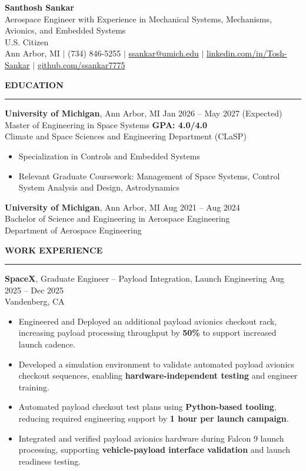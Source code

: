 \documentclass[10pt]{article}
\newcommand{\ressection}[1]{
  \vspace{0.12em}
  {\large\bfseries #1}\par
  \vspace{0.05em}\hrule\vspace{0.12em}
}
\begin{document}
\begin{center}
{\LARGE {\bfseries Santhosh Sankar}} \\
{\small Aerospace Engineer with Experience in Mechanical Systems, Mechanisms, Avionics, and Embedded Systems} \\
{\small U.S. Citizen} \\
Ann Arbor, MI \enspace $\vert$ \enspace (734) 846-5255 \enspace $\vert$ \enspace
\href{mailto:ssankar@umich.edu}{ssankar@umich.edu} \enspace $\vert$ \enspace
\href{https://www.linkedin.com/in/santhosh-sankar-3241521b8/}{linkedin.com/in/Tosh-Sankar} \enspace $\vert$ \enspace
\href{https://github.com/ssankar7775}{github.com/ssankar7775}
\end{center}

\ressection{EDUCATION}

{\bfseries University of Michigan}, Ann Arbor, MI \hfill Jan 2026 -- May 2027 (Expected) \\
Master of Engineering in Space Systems \hfill {\bfseries GPA: 4.0/4.0} \\
Climate and Space Sciences and Engineering Department (CLaSP)

\begin{itemize}
  \item Specialization in Controls and Embedded Systems
  \item Relevant Graduate Coursework: Management of Space Systems, Control System Analysis and Design, Astrodynamics
\end{itemize}

{\bfseries University of Michigan}, Ann Arbor, MI \hfill Aug 2021 -- Aug 2024 \\
Bachelor of Science and Engineering in Aerospace Engineering \\
Department of Aerospace Engineering

\ressection{WORK EXPERIENCE}

{\bfseries SpaceX}, Graduate Engineer -- Payload Integration, Launch Engineering \hfill Aug 2025 -- Dec 2025 \\
Vandenberg, CA
\begin{itemize}
\item Engineered and Deployed an additional payload avionics checkout rack, increasing payload processing throughput by \textbf{50\%} to support increased launch cadence.
\item Developed a simulation environment to validate automated payload avionics checkout sequences, enabling \textbf{hardware-independent testing} and engineer training.
\item Automated payload checkout test plans using \textbf{Python-based tooling}, reducing required engineering support by \textbf{1 hour per launch campaign}.
\item Integrated and verified payload avionics hardware during Falcon 9 launch processing, supporting \textbf{vehicle-payload interface validation} and launch readiness testing.
\end{itemize}
\end{document}
